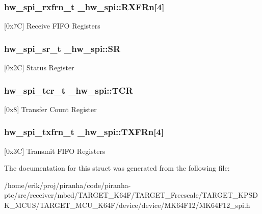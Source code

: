 \subsubsection[{\texorpdfstring{R\+X\+F\+Rn}{RXFRn}}]{ {\bf hw\+\_\+spi\+\_\+rxfrn\+\_\+t} \+\_\+hw\+\_\+spi\+::\+R\+X\+F\+Rn\mbox{[}4\mbox{]}}\hypertarget{struct__hw__spi_aa7061f74ca4473dc25955d11b1b48c3b}{}\label{struct__hw__spi_aa7061f74ca4473dc25955d11b1b48c3b}
\mbox{[}0x7C\mbox{]} Receive F\+I\+FO Registers 
\subsubsection[{\texorpdfstring{SR}{SR}}]{ {\bf hw\+\_\+spi\+\_\+sr\+\_\+t} \+\_\+hw\+\_\+spi\+::\+SR}\hypertarget{struct__hw__spi_ab60993cc9b7511e3d3a1138e5d0d8940}{}\label{struct__hw__spi_ab60993cc9b7511e3d3a1138e5d0d8940}
\mbox{[}0x2C\mbox{]} Status Register 
\subsubsection[{\texorpdfstring{T\+CR}{TCR}}]{ {\bf hw\+\_\+spi\+\_\+tcr\+\_\+t} \+\_\+hw\+\_\+spi\+::\+T\+CR}\hypertarget{struct__hw__spi_a97ede68093ddab2278b248b657a41bf5}{}\label{struct__hw__spi_a97ede68093ddab2278b248b657a41bf5}
\mbox{[}0x8\mbox{]} Transfer Count Register 
\subsubsection[{\texorpdfstring{T\+X\+F\+Rn}{TXFRn}}]{ {\bf hw\+\_\+spi\+\_\+txfrn\+\_\+t} \+\_\+hw\+\_\+spi\+::\+T\+X\+F\+Rn\mbox{[}4\mbox{]}}\hypertarget{struct__hw__spi_a44831cf4455d20e48ebb4e5942582ceb}{}\label{struct__hw__spi_a44831cf4455d20e48ebb4e5942582ceb}
\mbox{[}0x3C\mbox{]} Transmit F\+I\+FO Registers 

The documentation for this struct was generated from the following file\+:\begin{DoxyCompactItemize}
\item 
/home/erik/proj/piranha/code/piranha-\/ptc/src/receiver/mbed/\+T\+A\+R\+G\+E\+T\+\_\+\+K64\+F/\+T\+A\+R\+G\+E\+T\+\_\+\+Freescale/\+T\+A\+R\+G\+E\+T\+\_\+\+K\+P\+S\+D\+K\+\_\+\+M\+C\+U\+S/\+T\+A\+R\+G\+E\+T\+\_\+\+M\+C\+U\+\_\+\+K64\+F/device/device/\+M\+K64\+F12/M\+K64\+F12\+\_\+spi.\+h\end{DoxyCompactItemize}
